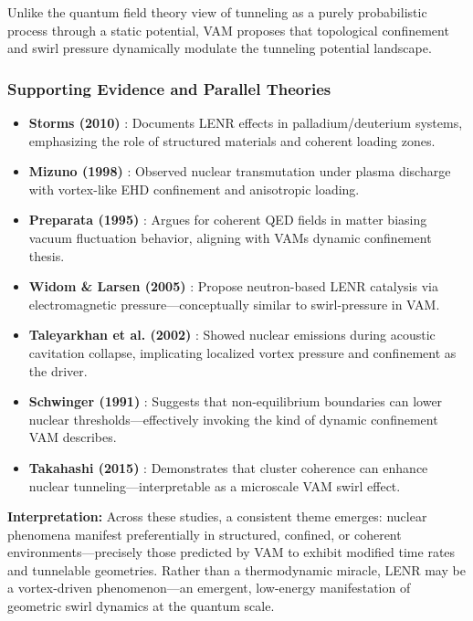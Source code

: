 Unlike the quantum field theory view of tunneling as a purely probabilistic process through a static potential, VAM proposes that topological confinement and swirl pressure dynamically modulate the tunneling potential landscape.

\subsubsection{Supporting Evidence and Parallel Theories}

\begin{itemize}
    \item \textbf{Storms (2010)} \cite{storms2010}: Documents LENR effects in palladium/deuterium systems, emphasizing the role of structured materials and coherent loading zones.

    \item \textbf{Mizuno (1998)} \cite{mizuno1998}: Observed nuclear transmutation under plasma discharge with vortex-like EHD confinement and anisotropic loading.

    \item \textbf{Preparata (1995)} \cite{preparata1995}: Argues for coherent QED fields in matter biasing vacuum fluctuation behavior, aligning with VAM\rqs s dynamic confinement thesis.

    \item \textbf{Widom \& Larsen (2005)} \cite{widom2005}: Propose neutron-based LENR catalysis via electromagnetic pressure---conceptually similar to swirl-pressure in VAM.

    \item \textbf{Taleyarkhan et al. (2002)} \cite{taleyarkhan2002}: Showed nuclear emissions during acoustic cavitation collapse, implicating localized vortex pressure and confinement as the driver.

    \item \textbf{Schwinger (1991)} \cite{schwinger1991}: Suggests that non-equilibrium boundaries can lower nuclear thresholds---effectively invoking the kind of dynamic confinement VAM describes.

    \item \textbf{Takahashi (2015)} \cite{takahashi2015}: Demonstrates that cluster coherence can enhance nuclear tunneling---interpretable as a microscale VAM swirl effect.
\end{itemize}

\textbf{Interpretation:} Across these studies, a consistent theme emerges: nuclear phenomena manifest preferentially in structured, confined, or coherent environments---precisely those predicted by VAM to exhibit modified time rates and tunnelable geometries. Rather than a thermodynamic miracle, LENR may be a vortex-driven phenomenon—an emergent, low-energy manifestation of geometric swirl dynamics at the quantum scale.